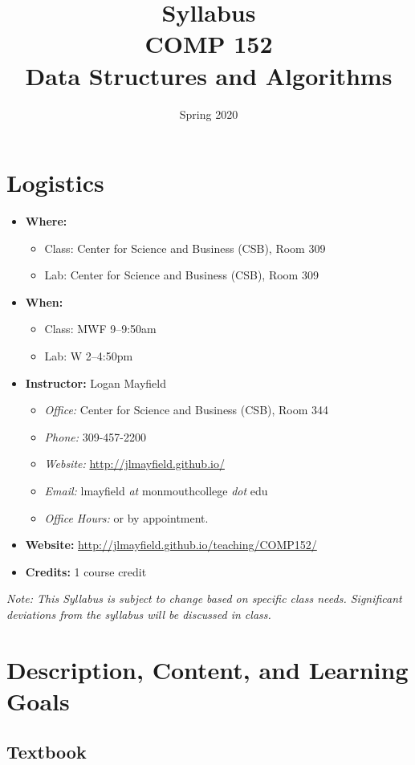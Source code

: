 \documentclass[10pt]{article}
\title{Syllabus \\ COMP 152 \\ Data Structures and Algorithms}
\author{  }
\date{Spring 2020}
\begin{document}
\maketitle

\section{Logistics}
\begin{itemize}
\item \textbf{Where: }
\begin{itemize}
\item Class: Center for Science and Business (CSB), Room 309
\item Lab: Center for Science and Business (CSB), Room 309
\end{itemize}
\item \textbf{When: }
\begin{itemize}
  \item Class: MWF 9--9:50am
  \item Lab: W 2--4:50pm
\end{itemize}
\item \textbf{Instructor: } Logan Mayfield
\begin{itemize}
\item \textit{Office: } Center for Science and Business (CSB), Room 344
\item \textit{Phone: } 309-457-2200 %
\item \textit{Website: } \url{http://jlmayfield.github.io/}
\item \textit{Email: } lmayfield \textit{at} monmouthcollege \textit{dot} edu
\item \textit{Office Hours: }   or by appointment.
\end{itemize}
\item \textbf{Website: } \url{http://jlmayfield.github.io/teaching/COMP152/}
\item \textbf{Credits: } 1 course credit
\end{itemize}
\emph{Note: This Syllabus is subject to change based on specific class needs. Significant deviations from the syllabus will be discussed in class.}


\section{Description, Content, and Learning Goals}


\subsection{Textbook}
\end{document}
